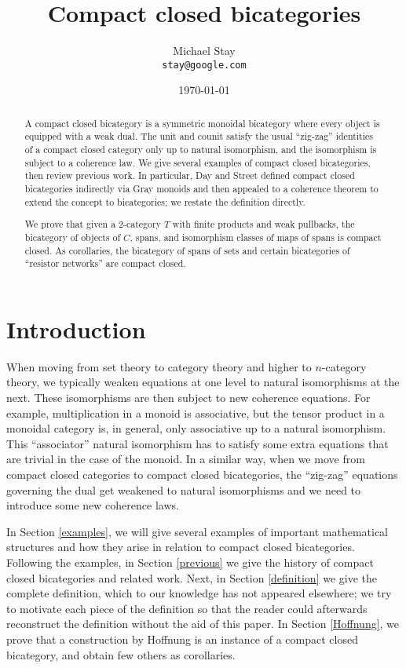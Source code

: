 \documentclass{article}
\title{Compact closed bicategories}
\author{Michael Stay \\ \texttt{stay@google.com}}
\date{\today}
\begin{document}
\maketitle

\begin{abstract}
A compact closed bicategory is a symmetric monoidal bicategory where every object is equipped with a weak dual. The unit and counit satisfy the usual ``zig-zag'' identities of a compact closed category only up to natural isomorphism, and the isomorphism is subject to a coherence law.  We give several examples of compact closed bicategories, then review previous work.  In particular, Day and Street defined compact closed bicategories indirectly via Gray monoids and then appealed to a coherence theorem to extend the concept to bicategories; we restate the definition directly.

We prove that given a 2-category $T$ with finite products and weak pullbacks, the bicategory of objects of $C$, spans, and isomorphism classes of maps of spans is compact closed.  As corollaries, the bicategory of spans of sets and certain bicategories of ``resistor networks'' are compact closed.
\end{abstract}

\section{Introduction}

When moving from set theory to category theory and higher to $n$-category theory, we typically weaken equations at one level to natural isomorphisms at the next.  These isomorphisms are then subject to new coherence equations.  For example, multiplication in a monoid is associative, but the tensor product in a monoidal category is, in general, only associative up to a natural isomorphism.  This ``associator'' natural isomorphism has to satisfy some extra equations that are trivial in the case of the monoid.  In a similar way, when we move from compact closed categories to compact closed bicategories, the ``zig-zag'' equations governing the dual get weakened to natural isomorphisms and we need to introduce some new coherence laws.

In Section \ref{examples}, we will give several examples of important mathematical structures and how they arise in relation to compact closed bicategories.  Following the examples, in Section \ref{previous} we give the history of compact closed bicategories and related work.  Next, in Section \ref{definition} we give the complete definition, which to our knowledge has not appeared elsewhere; we try to motivate each piece of the definition so that the reader could afterwards reconstruct the definition without the aid of this paper.  In Section \ref{Hoffnung}, we prove that a construction by Hoffnung is an instance of a compact closed bicategory, and obtain few others as corollaries.
\end{document}
